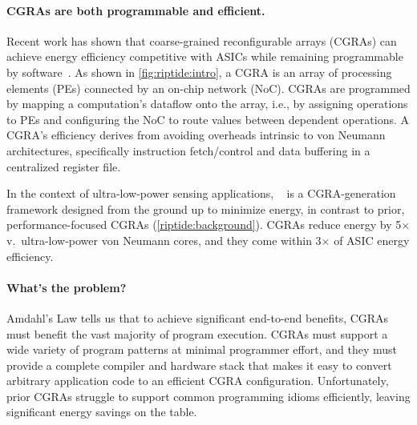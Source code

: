 \paragraph{CGRAs are both programmable and efficient.}
%
Recent work has shown that coarse-grained reconfigurable
arrays (CGRAs) can achieve energy efficiency competitive with ASICs
while remaining programmable by software~\cite{snafu,nowatzki2017domain,weng2020dsagen}.
%
As shown in \autoref{fig:riptide:intro},
a CGRA
 is an array of processing elements
(PEs) connected by an on-chip network (NoC).
%
CGRAs are programmed by mapping a computation's dataflow
onto the array, i.e., by assigning operations to PEs and configuring
the NoC to route values between dependent operations.
%
A CGRA's efficiency derives from avoiding overheads intrinsic to von
Neumann architectures, specifically instruction fetch/control and data
buffering in a centralized register file.

In the context of ultra-low-power sensing applications,
\snafu~\cite{snafu} is a CGRA-generation framework designed from
the ground up to minimize energy, in contrast to prior,
performance-focused CGRAs (\autoref{riptide:background}).
%
\snafu CGRAs reduce energy by 5$\times$ v.\ ultra-low-power von Neumann
cores, and they come within 3$\times$ of ASIC energy efficiency.

%

\paragraph{What's the problem?}
%
Amdahl's Law tells us that to achieve significant end-to-end benefits,
CGRAs must benefit the vast majority of program execution.
%
CGRAs must support a wide variety of program patterns at minimal programmer effort,
% 
and they must provide a complete compiler and hardware stack that makes it easy to convert arbitrary application code to an efficient CGRA configuration.
%
Unfortunately, prior CGRAs struggle to support common programming
idioms efficiently, leaving significant energy savings on the table.

